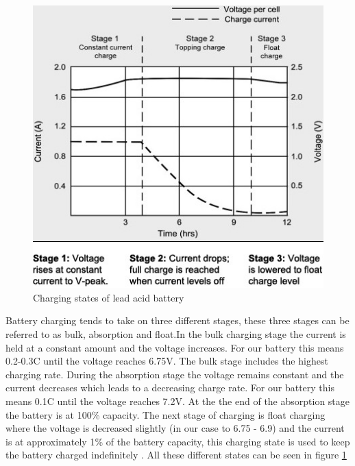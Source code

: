 \label{sec:BatteryCharging}
\begin{figure}
\centering
\includegraphics[scale=0.4]{Figures/cc.jpg}
\caption[{Charging states of lead acid battery }]{Charging states of lead acid battery \cite{RS}}
\label{fig:states}
\end{figure}
 Battery charging tends to take on three different stages, these three stages can be referred to as bulk, absorption and float\cite{CC}.In the bulk charging stage the current is held at a constant amount and the voltage increases. For our battery this means 0.2-0.3C until the voltage reaches 6.75V\cite{RS}. The bulk stage includes the highest charging rate. During the absorption stage the voltage remains constant and the current decreases which leads to a decreasing charge rate. For our battery this means 0.1C until the voltage reaches 7.2V\cite{RS}. At the the end of the absorption stage the battery is at 100\% capacity. The next stage of charging is float charging where the voltage is decreased slightly (in our case to 6.75 - 6.9) and the current is at approximately 1\% of the battery capacity, this charging state is used to keep the battery charged indefinitely \cite{CC}. All these different states can be seen in figure \ref{fig:states} 






